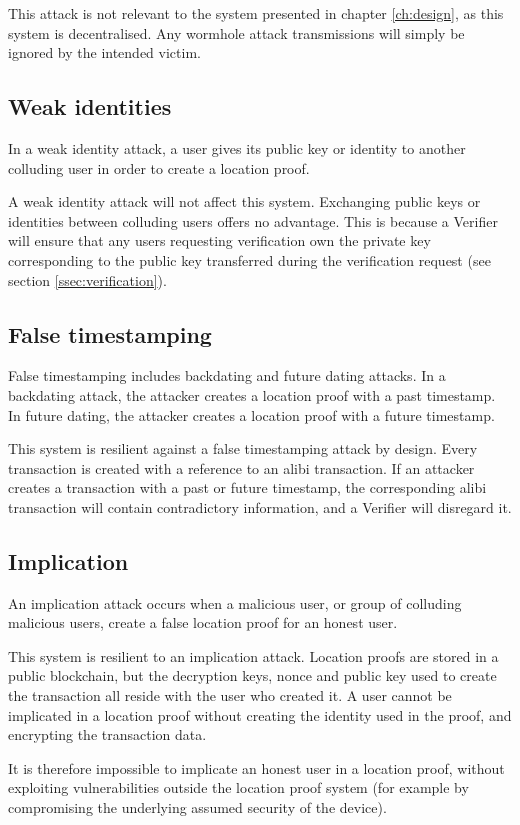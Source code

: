 This attack is not relevant to the system presented in chapter \ref{ch:design}, as this system is decentralised. Any wormhole attack transmissions will simply be ignored by the intended victim.

\subsection{Weak identities}
In a weak identity attack, a user gives its public key or identity to another colluding user in order to create a location proof.

A weak identity attack will not affect this system. Exchanging public keys or identities between colluding users offers no advantage. This is because a Verifier will ensure that any users requesting verification own the private key corresponding to the public key transferred during the verification request (see section \ref{ssec:verification}).

\subsection{False timestamping}
False timestamping includes backdating and future dating attacks. In a backdating attack, the attacker creates a location proof with a past timestamp. In future dating, the attacker creates a location proof with a future timestamp.

This system is resilient against a false timestamping attack by design. Every transaction is created with a reference to an alibi transaction. If an attacker creates a transaction with a past or future timestamp, the corresponding alibi transaction will contain contradictory information, and a Verifier will disregard it.

\subsection{Implication}
An implication attack occurs when a malicious user, or group of colluding malicious users, create a false location proof for an honest user.

This system is resilient to an implication attack. Location proofs are stored in a public blockchain, but the decryption keys, nonce and public key used to create the transaction all reside with the user who created it. A user cannot be implicated in a location proof without creating the identity used in the proof, and encrypting the transaction data.

It is therefore impossible to implicate an honest user in a location proof, without exploiting vulnerabilities outside the location proof system (for example by compromising the underlying assumed security of the device).

